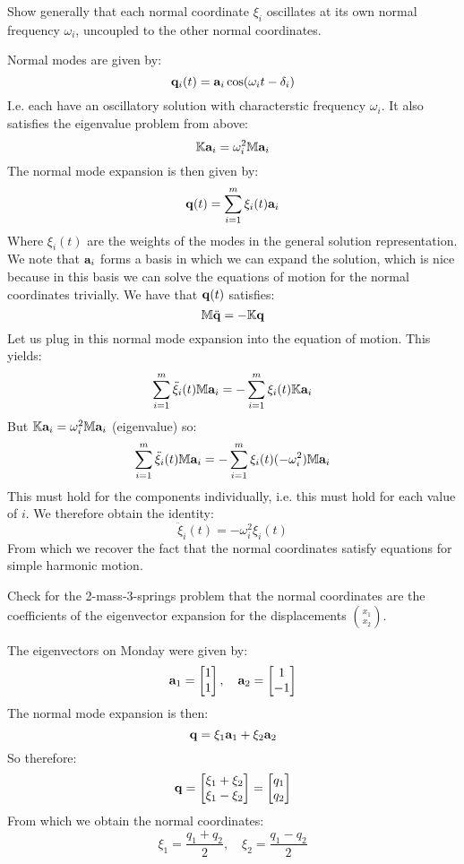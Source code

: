 \begin{p}
Show generally that each normal coordinate $\xi_i$ oscillates at its own normal frequency $\omega_i$, uncoupled to the other normal coordinates. 
\end{p}
\begin{s}
Normal modes are given by:
\[\mathbf{q}_i(t) = \mathbf{a}_i\cos(\omega_i t - \delta_i)\]
I.e. each have an oscillatory solution with characterstic frequency $\omega_i$. It also satisfies the eigenvalue problem from above:
\[\mathbb{K}\mathbf{a}_i = \omega^2_i\mathbb{M}\mathbf{a}_i\]
The normal mode expansion is then given by:
\[\mathbf{q}(t) = \sum_{i=1}^m \xi_i(t)\mathbf{a}_i\]
Where $\xi_i(t)$ are the weights of the modes in the general solution representation. We note that $\mathbf{a}_i$ forms a basis in which we can expand the solution, which is nice because in this basis we can solve the equations of motion for the normal coordinates trivially. We have that $\mathbf{q}(t)$ satisfies:
\[\mathbb{M}\ddot{\mathbf{q}} = -\mathbb{K}\mathbf{q}\]
Let us plug in this normal mode expansion into the equation of motion. This yields:
\[\sum_{i=1}^m\ddot{\xi}_i(t)\mathbb{M}\mathbf{a}_i = -\sum_{i=1}^m\xi_i(t)\mathbb{K}\mathbf{a}_i\]
But $\mathbb{K}\mathbf{a}_i = \omega_i^2\mathbb{M}\mathbf{a}_i$ (eigenvalue) so:
\[\sum_{i=1}^m\ddot{\xi}_i(t)\mathbb{M}\mathbf{a}_i = -\sum_{i=1}^m\xi_i(t)(-\omega_i^2)\mathbb{M}\mathbf{a}_i\]
This must hold for the components individually, i.e. this must hold for each value of $i$. We therefore obtain the identity:
\[\ddot{\xi}_i(t) = -\omega_i^2\xi_i(t)\]
From which we recover the fact that the normal coordinates satisfy equations for simple harmonic motion.
\end{s}

\begin{p}
Check for the 2-mass-3-springs problem that the normal coordinates are the coefficients of the eigenvector expansion for the displacements $\binom{x_1}{x_2}$.
\end{p}
\begin{s}
The eigenvectors on Monday were given by:
\[\mathbf{a}_1 = \begin{bmatrix}1 \\ 1\end{bmatrix}, \quad \mathbf{a}_2 = \begin{bmatrix}1 \\ -1\end{bmatrix}\]
The normal mode expansion is then:
\[\mathbf{q} = \xi_1\mathbf{a}_1 + \xi_2\mathbf{a}_2\]
So therefore:
\[\mathbf{q} = \begin{bmatrix}\xi_1 + \xi_2 \\ \xi_1 - \xi_2\end{bmatrix} = \begin{bmatrix}q_1 \\ q_2\end{bmatrix}\]
From which we obtain the normal coordinates:
\[\xi_1 = \frac{q_1 + q_2}{2}, \quad \xi_2 = \frac{q_1 - q_2}{2}\]
\end{s}

